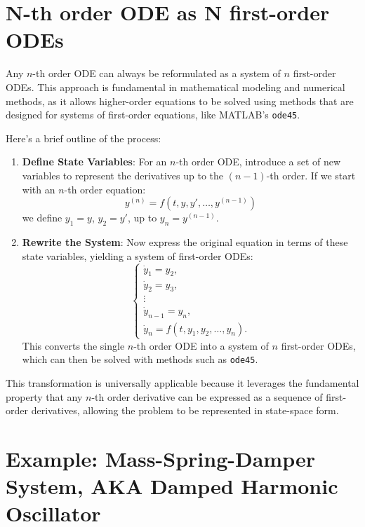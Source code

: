 \documentclass{article}
\begin{document}
\section{N-th order ODE as N first-order ODEs}

Any \( n \)-th order ODE can always be reformulated as a system of \( n \) first-order ODEs. This approach is fundamental in mathematical modeling and numerical methods, as it allows higher-order equations to be solved using methods that are designed for systems of first-order equations, like MATLAB’s \texttt{ode45}.

Here’s a brief outline of the process:

\begin{enumerate}
    \item \textbf{Define State Variables}: For an \( n \)-th order ODE, introduce a set of new variables to represent the derivatives up to the \( (n-1) \)-th order. If we start with an \( n \)-th order equation:
    \[
    y^{(n)} = f(t, y, y', \dots, y^{(n-1)})
    \]
    we define \( y_1 = y \), \( y_2 = y' \), up to \( y_n = y^{(n-1)} \).
    
    \item \textbf{Rewrite the System}: Now express the original equation in terms of these state variables, yielding a system of first-order ODEs:
    \[
    \begin{cases}
        \dot{y}_1 = y_2, \\
        \dot{y}_2 = y_3, \\
        \vdots \\
        \dot{y}_{n-1} = y_n, \\
        \dot{y}_n = f(t, y_1, y_2, \dots, y_n).
    \end{cases}
    \]
    This converts the single \( n \)-th order ODE into a system of \( n \) first-order ODEs, which can then be solved with methods such as \texttt{ode45}.
\end{enumerate}

This transformation is universally applicable because it leverages the fundamental property that any \( n \)-th order derivative can be expressed as a sequence of first-order derivatives, allowing the problem to be represented in state-space form.

\section*{Example: Mass-Spring-Damper System, AKA Damped Harmonic Oscillator}
\end{document}
